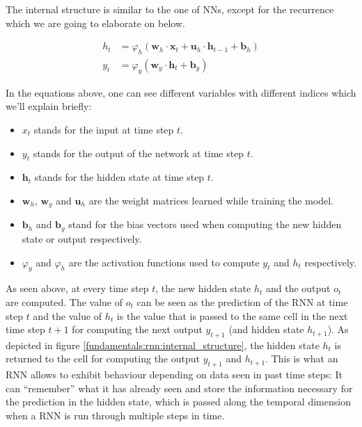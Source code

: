 The internal structure is similar to the one of NNs, except for the recurrence which we are going to elaborate on below.

\begin{equation}
\begin{split}
h_t & = \varphi_h(\mathbf{w}_h \cdot \mathbf{x}_t + \mathbf{u}_h \cdot \mathbf{h}_{t-1} + \mathbf{b}_h) \\
y_t & = \varphi_y(\mathbf{w}_y \cdot \mathbf{h}_t + \mathbf{b}_y)
\end{split}
\label{fundamentals:rnn:forward_equation:hidden}
\end{equation}

In the equations above, one can see different variables with different indices which we'll explain briefly:

\begin{itemize}[noitemsep]
	\item $x_t$ stands for the input at time step $t$.
	\item $y_t$ stands for the output of the network at time step $t$.
	\item $\mathbf{h}_t$ stands for the hidden state at time step $t$.
	\item $\mathbf{w}_h$, $\mathbf{w}_y$ and $\mathbf{u}_h$ are the weight matrices learned while training the model.
	\item $\mathbf{b}_h$ and $\mathbf{b}_y$ stand for the bias vectors used when computing the new hidden state or output respectively.
	\item $\varphi_y$ and $\varphi_h$ are the activation functions used to compute $y_t$ and $h_t$ respectively.
\end{itemize}

As seen above, at every time step $t$, the new hidden state $h_t$ and the output $o_t$ are computed. The value of $o_t$ can be seen as the prediction of the RNN at time step $t$ and the value of $h_t$ is the value that is passed to the same cell in the next time step $t+1$ for computing the next output $y_{t+1}$ (and hidden state $h_{t+1}$). As depicted in figure \ref{fundamentals:rnn:internal_structure}, the hidden state $h_t$ is returned to the cell for computing the output $y_{t+1}$ and $h_{t+1}$. This is what an RNN allows to exhibit behaviour depending on data seen in past time steps: It can ``remember'' what it has already seen and store the information necessary for the prediction in the hidden state, which is passed along the temporal dimension when a RNN is run through multiple steps in time.

